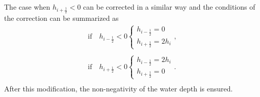 The case when $h_{i+\frac12}<0$ can be corrected in a similar way and the conditions of the 
correction can be summarized as \cite{kurg2}
\begin{equation}\label{kurgMod}
\begin{array}{c}
\text{if} \quad h_{i-\frac12}<0 \begin{cases}
h_{i-\frac12}=0\\
h_{i+\frac12}=2h_i
\end{cases},\\
\\
\text{if} \quad h_{i+\frac12}<0 \begin{cases}
h_{i-\frac12}=2h_i\\
h_{i+\frac12}=0
\end{cases}.\\
\end{array}  
\end{equation}
After this modification, the non-negativity of the water depth is ensured. 

